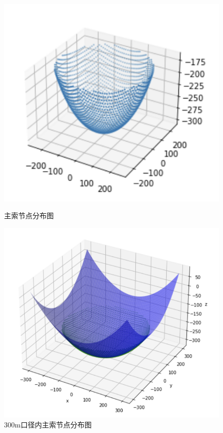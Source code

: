 \documentclass[withoutpreface,bwprint]{cumcmthesis} %
\begin{document}
\begin{figure}[H]
    \begin{minipage}[t]{0.5\linewidth}
    \centering
    \includegraphics[scale=0.5]{images/allsuo.png}
    \caption{主索节点分布图}
    \label{fig:side:c}
    \end{minipage}%
    \begin{minipage}[t]{0.5\linewidth}
    \centering
    \includegraphics[scale=0.35]{images/zhunbei2.png}
    \caption{300m口径内主索节点分布图}
    \label{fig:side:d}
    \end{minipage}
\end{figure}
\end{document}

